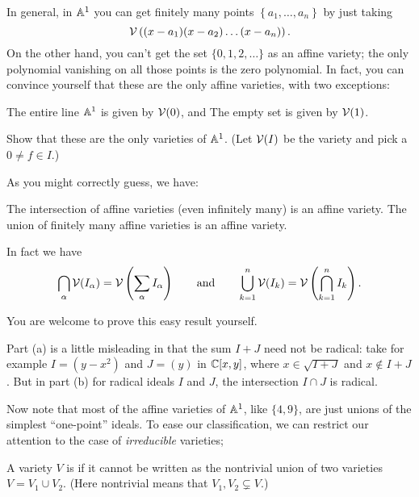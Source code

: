 In general, in $\mathbb A^1$ you can get finitely many points $\left\{ a_1, \dots, a_n \right\}$ by
just taking \[ \mathcal V\left( (x-a_1)(x-a_2)\dots(x-a_n) \right). \]
On the other hand, you can't get the set $\{0,1,2,\dots\}$ as an affine variety; the only polynomial vanishing
on all those points is the zero polynomial.
In fact, you can convince yourself that these are the only affine varieties, with two exceptions:
\begin{itemize}
	\ii The entire line $\mathbb A^1$ is given by $\mathcal V(0)$, and
	\ii The empty set is given by $\mathcal V(1)$.
\end{itemize}
\begin{ques}
	Show that these are the only varieties of $\mathbb A^1$.
	(Let $\mathcal V(I)$ be the variety and pick a $0 \neq f \in I$.)
\end{ques}

As you might correctly guess, we have:
\begin{theorem}
	\label{thm:many_aff_variety}
	\listhack
	\begin{enumerate}[(a)]
		\ii The intersection of affine varieties
		(even infinitely many) is an affine variety.
		\ii The union of finitely many affine varieties
		is an affine variety.
	\end{enumerate}
	In fact we have
	\[ \bigcap_\alpha \mathcal V(I_\alpha)
		= \mathcal V\left( \sum_\alpha I_\alpha \right)
		\qquad\text{and}\qquad
		\bigcup_{k=1}^n \mathcal V(I_k)
		= \mathcal V\left( \bigcap_{k=1}^n I_k \right). \]
\end{theorem}
You are welcome to prove this easy result yourself.
\begin{remark}
	Part (a) is a little misleading in that the sum $I+J$ need not be radical:
	take for example $I = (y-x^2)$ and $J = (y)$ in $\mathbb C[x,y]$,
	where $x \in \sqrt{I+J}$ and $x \notin I+J$.
	But in part (b) for radical ideals $I$ and $J$,
	the intersection $I \cap J$ is radical.
\end{remark}

Now note that most of the affine varieties of $\mathbb A^1$, like $\{4,9\}$,
are just unions of the simplest ``one-point'' ideals.
To ease our classification,
we can restrict our attention to the case of \emph{irreducible} varieties;
\begin{definition}
	A variety $V$ is  if it cannot be written
	as the nontrivial union of two varieties $V = V_1 \cup V_2$.
	(Here nontrivial means that $V_1, V_2 \subsetneq V$.)
\end{definition}

